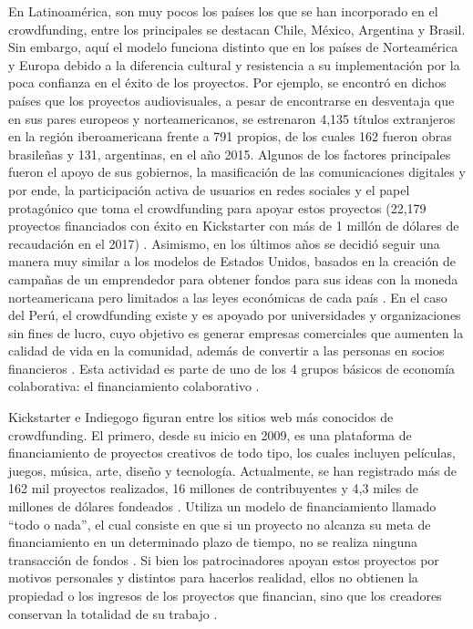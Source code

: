 En Latinoamérica, son muy pocos los países los que se han incorporado en el crowdfunding, entre los principales se destacan Chile, México, Argentina y Brasil. Sin embargo, aquí el modelo funciona distinto que en los países de Norteamérica y Europa debido a la diferencia cultural y resistencia a su implementación por la poca confianza en el éxito de los proyectos. Por ejemplo, se encontró en dichos países que los proyectos audiovisuales, a pesar de encontrarse en desventaja que en sus pares europeos y norteamericanos, se estrenaron 4,135 títulos extranjeros en la región iberoamericana frente a 791 propios, de los cuales 162 fueron obras brasileñas y 131, argentinas, en el año 2015. Algunos de los factores principales fueron el apoyo de sus gobiernos, la masificación de las comunicaciones digitales y por ende, la participación activa de usuarios en redes sociales y el papel protagónico que toma el crowdfunding para apoyar estos proyectos (22,179 proyectos financiados con éxito en Kickstarter con más de 1 millón de dólares de recaudación en el 2017) \parencite{cr_lopezgolan2017crowdfunding}. Asimismo, en los últimos años se decidió seguir una manera muy similar a los modelos de Estados Unidos, basados en la creación de campañas de un emprendedor para obtener fondos para sus ideas con la moneda norteamericana pero limitados a las leyes económicas de cada país \parencite{cr_sl_crowdfundlatam}. En el caso del Perú, el crowdfunding existe y es apoyado por universidades y organizaciones sin fines de lucro, cuyo objetivo es generar empresas comerciales que aumenten la calidad de vida en la comunidad, además de convertir a las personas en socios financieros \parencite{cr_fernandezbedoya2020colecoperu}. Esta actividad es parte de uno de los 4 grupos básicos de economía colaborativa: el financiamiento colaborativo \parencite{cr_stokes2014coleco}.

Kickstarter e Indiegogo figuran entre los sitios web más conocidos de crowdfunding. El primero, desde su inicio en 2009, es una plataforma de financiamiento de proyectos creativos de todo tipo, los cuales incluyen películas, juegos, música, arte, diseño y tecnología. Actualmente, se han registrado más de 162 mil proyectos realizados, 16 millones de contribuyentes y 4,3 miles de millones de dólares fondeados \parencite{cr_kickstarter_about}. Utiliza un modelo de financiamiento llamado “todo o nada”, el cual consiste en que si un proyecto no alcanza su meta de financiamiento en un determinado plazo de tiempo, no se realiza ninguna transacción de fondos \parencite{cr_kickstarter_founding}. Si bien los patrocinadores apoyan estos proyectos por motivos personales y distintos para hacerlos realidad, ellos no obtienen la propiedad o los ingresos de los proyectos que financian, sino que los creadores conservan la totalidad de su trabajo \parencite{cr_kickstarter_press}.


